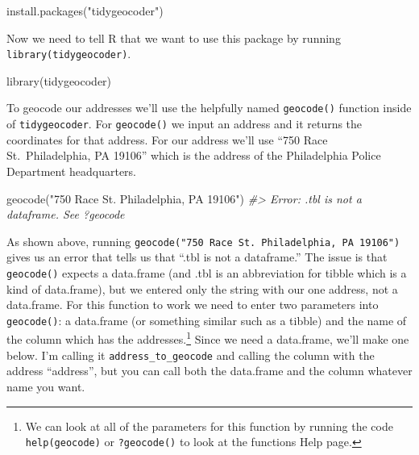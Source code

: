\documentclass[
]{krantz}
\makeatletter
\newenvironment{Shaded}{\begin{snugshade}}{\end{snugshade}}
\newcommand{\CommentTok}[1]{\textcolor[rgb]{0.37,0.37,0.37}{\textit{#1}}}
\newcommand{\FunctionTok}[1]{\textcolor[rgb]{0,0,0}{#1}}
\newcommand{\NormalTok}[1]{#1}
\newcommand{\StringTok}[1]{\textcolor[rgb]{0.5,0.5,0.5}{#1}}
\newenvironment{kframe}{%
\medskip{}
\setlength{\fboxsep}{.8em}
 \def\at@end@of@kframe{}%
 \ifinner\ifhmode%
  \def\at@end@of@kframe{\end{minipage}}%
  \begin{minipage}{\columnwidth}%
 \fi\fi%
 \def\FrameCommand##1{\hskip\@totalleftmargin \hskip-\fboxsep
 \colorbox{shadecolor}{##1}\hskip-\fboxsep
     \hskip-\linewidth \hskip-\@totalleftmargin \hskip\columnwidth}%
 \MakeFramed {\advance\hsize-\width
   \@totalleftmargin\z@ \linewidth\hsize
   \@setminipage}}%
 {\par\unskip\endMakeFramed%
 \at@end@of@kframe}
\renewenvironment{Shaded}{\begin{kframe}}{\end{kframe}}
\makeatother
\begin{document}
\begin{Shaded}
\begin{Highlighting}[]
\FunctionTok{install.packages}\NormalTok{(}\StringTok{"tidygeocoder"}\NormalTok{)}
\end{Highlighting}
\end{Shaded}

Now we need to tell R that we want to use this package by running \texttt{library(tidygeocoder)}.

\begin{Shaded}
\begin{Highlighting}[]
\FunctionTok{library}\NormalTok{(tidygeocoder)}
\end{Highlighting}
\end{Shaded}

To geocode our addresses we'll use the helpfully named \texttt{geocode()} function inside of \texttt{tidygeocoder}. For \texttt{geocode()} we input an address and it returns the coordinates for that address. For our address we'll use ``750 Race St.~Philadelphia, PA 19106'' which is the address of the Philadelphia Police Department headquarters.

\begin{Shaded}
\begin{Highlighting}[]
\FunctionTok{geocode}\NormalTok{(}\StringTok{"750 Race St. Philadelphia, PA 19106"}\NormalTok{)}
\CommentTok{\#\textgreater{} Error: .tbl is not a dataframe. See ?geocode}
\end{Highlighting}
\end{Shaded}

As shown above, running \texttt{geocode("750\ Race\ St.\ Philadelphia,\ PA\ 19106")} gives us an error that tells us that ``.tbl is not a dataframe.'' The issue is that \texttt{geocode()} expects a data.frame (and .tbl is an abbreviation for tibble which is a kind of data.frame), but we entered only the string with our one address, not a data.frame. For this function to work we need to enter two parameters into \texttt{geocode()}: a data.frame (or something similar such as a tibble) and the name of the column which has the addresses.\footnote{We can look at all of the parameters for this function by running the code \texttt{help(geocode)} or \texttt{?geocode()} to look at the functions Help page.} Since we need a data.frame, we'll make one below. I'm calling it \texttt{address\_to\_geocode} and calling the column with the address ``address'', but you can call both the data.frame and the column whatever name you want.
\end{document}
